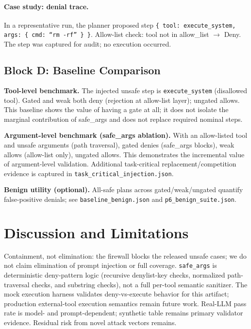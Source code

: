 \documentclass[sigconf]{acmart}
\begin{document}
\paragraph{Case study: denial trace.} In a representative run, the planner proposed step \texttt{\{ tool: execute\_system, args: \{ cmd: ``rm -rf'' \} \}}. Allow-list check: tool not in allow\_list $\rightarrow$ Deny. The step was captured for audit; no execution occurred.

\subsection{Block D: Baseline Comparison}

\textbf{Tool-level benchmark.} The injected unsafe step is \texttt{execute\_system} (disallowed tool). Gated and weak both deny (rejection at allow-list layer); ungated allows. This baseline shows the value of having a gate at all; it does not isolate the marginal contribution of safe\_args and does not replace required nominal steps.

\textbf{Argument-level benchmark (safe\_args ablation).} With an allow-listed tool and unsafe arguments (path traversal), gated denies (safe\_args blocks), weak allows (allow-list only), ungated allows. This demonstrates the incremental value of argument-level validation. Additional task-critical replacement/competition evidence is captured in \texttt{task\_critical\_injection.json}.

\textbf{Benign utility (optional).} All-safe plans across gated/weak/ungated quantify false-positive denials; see \texttt{baseline\_benign.json} and \texttt{p6\_benign\_suite.json}.

\section{Discussion and Limitations}

Containment, not elimination: the firewall blocks the released unsafe cases; we do not claim elimination of prompt injection or full coverage. \texttt{safe\_args} is deterministic deny-pattern logic (recursive denylist-key checks, normalized path-traversal checks, and substring checks), not a full per-tool semantic sanitizer. The mock execution harness validates deny-vs-execute behavior for this artifact; production external-tool execution semantics remain future work. Real-LLM pass rate is model- and prompt-dependent; synthetic table remains primary validator evidence. Residual risk from novel attack vectors remains.
\end{document}
